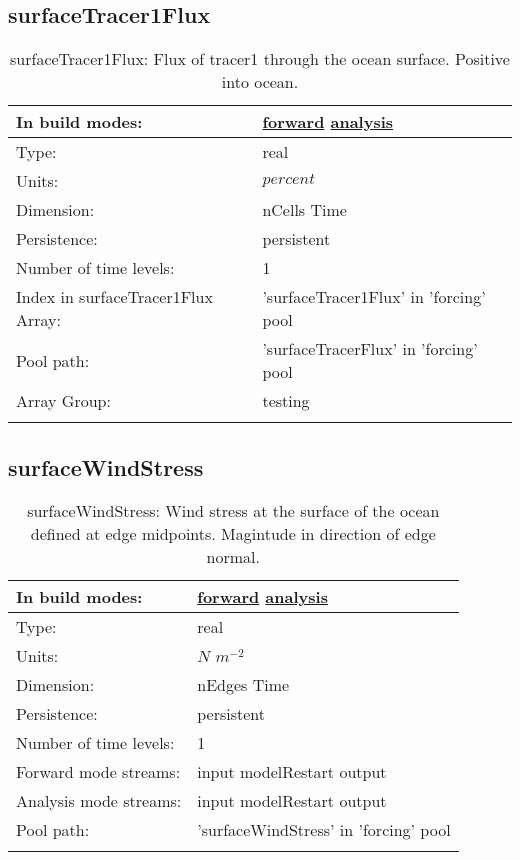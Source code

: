 \subsection[surfaceTracer1Flux]{surfaceTracer1Flux}
\label{subsec:var_sec_forcing_surfaceTracer1Flux}
\begin{center}
\begin{longtable}{| p{2.0in} | p{4.0in} |}
        \hline 
        In build modes: & \hyperref[subsec:forward_var_tab_forcing]{forward} \hyperref[subsec:analysis_var_tab_forcing]{analysis} \\
        \hline 
        Type: & real \\
        \hline 
        Units: & $percent$ \\
        \hline 
        Dimension: & nCells Time \\
        \hline 
        Persistence: & persistent \\
        \hline 
        Number of time levels: & 1 \\
        \hline 
		 Index in surfaceTracer1Flux Array: & 'surfaceTracer1Flux' in 'forcing' pool \\
		 \hline 
            Pool path: & 'surfaceTracerFlux' in 'forcing' pool
 \\
		 \hline 
		 Array Group: & testing \\
		 \hline 
    \caption{surfaceTracer1Flux: Flux of tracer1 through the ocean surface. Positive into ocean.}
\end{longtable}
\end{center}
\subsection[surfaceWindStress]{surfaceWindStress}
\label{subsec:var_sec_forcing_surfaceWindStress}
\begin{center}
\begin{longtable}{| p{2.0in} | p{4.0in} |}
        \hline 
        In build modes: & \hyperref[subsec:forward_var_tab_forcing]{forward} \hyperref[subsec:analysis_var_tab_forcing]{analysis} \\
        \hline 
        Type: & real \\
        \hline 
        Units: & $N$ $m^{-2}$ \\
        \hline 
        Dimension: & nEdges Time \\
        \hline 
        Persistence: & persistent \\
        \hline 
        Number of time levels: & 1 \\
        \hline 
		 Forward mode streams: &  input modelRestart output \\
        \hline 
		 Analysis mode streams: &  input modelRestart output \\
        \hline 
            Pool path: & 'surfaceWindStress' in 'forcing' pool
 \\
		 \hline 
    \caption{surfaceWindStress: Wind stress at the surface of the ocean defined at edge midpoints. Magintude in direction of edge normal.}
\end{longtable}
\end{center}
